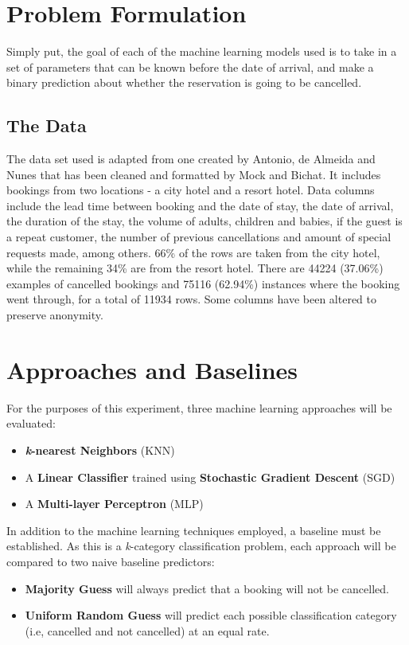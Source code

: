 \documentclass[10pt,conference]{IEEEtran}
\begin{document}
\section{Problem Formulation}
  Simply put, the goal of each of the machine learning models used is to take in a set of parameters that can be known before the date of arrival, and make a binary prediction about whether the reservation is going to be cancelled.
  \subsection{The Data}
    The data set used is adapted from one created by Antonio, de Almeida and Nunes\cite{Antonio2019} that has been cleaned and formatted by Mock and Bichat\cite{mock_bichat}. It includes bookings from two locations - a city hotel and a resort hotel. Data columns include the lead time between booking and the date of stay, the date of arrival, the duration of the stay, the volume of adults, children and babies, if the guest is a repeat customer, the number of previous cancellations and amount of special requests made, among others. 66\% of the rows are taken from the city hotel, while the remaining 34\% are from the resort hotel. There are 44224 (37.06\%) examples of cancelled bookings and 75116 (62.94\%) instances where the booking went through, for a total of 11934 rows. Some columns have been altered to preserve anonymity\cite{Antonio2019}.
  
  

\section{Approaches and Baselines}
  For the purposes of this experiment, three machine learning approaches will be evaluated:
  \begin{itemize}
    \item \textbf{\emph{k}-nearest Neighbors} (KNN) 
    \item A \textbf{Linear Classifier} trained using \textbf{Stochastic Gradient Descent} (SGD)
    \item A \textbf{Multi-layer Perceptron} (MLP)
  \end{itemize}
  In addition to the machine learning techniques employed, a baseline must be established. As this is a \emph{k}-category classification problem, each approach will be compared to two naive baseline predictors:
  \begin{itemize}
    \item \textbf{Majority Guess} will always predict that a booking will not be cancelled.
    \item \textbf{Uniform Random Guess} will predict each possible classification category (i.e, cancelled and not cancelled) at an equal rate.
  \end{itemize}
\end{document}
